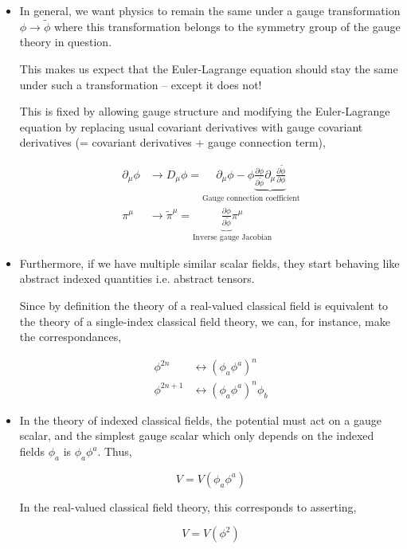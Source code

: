 \documentclass{beamer}
\begin{document}
\begin{frame}
\begin{itemize}
\item In general, we want physics to remain the same under a gauge transformation $\phi \to \widetilde{\phi}$ where this transformation belongs to the symmetry group of the gauge theory in question.

This makes us expect that the Euler-Lagrange equation should stay the same under such a transformation -- except it does not! 

This is fixed by allowing gauge structure and modifying the Euler-Lagrange equation by replacing usual covariant derivatives with gauge covariant derivatives (= covariant derivatives + gauge connection term),

\begin{align*}
\partial_\mu \phi & \to D_\mu \phi = \underset{\text{Gauge connection coefficient}}{\partial_\mu \phi - \phi \underbrace{\frac{\partial \phi}{\partial \widetilde{\phi}} \partial_\mu \frac{\partial \widetilde{\phi}}{\partial \phi}}} \\
\pi^\mu & \to \widetilde{\pi}^\mu = \underset{\text{Inverse gauge Jacobian}}{\underbrace{\frac{\partial \phi}{\partial \widetilde{\phi}}} \pi^\mu}
\end{align*}
\end{itemize}
\end{frame}

\begin{frame}
\begin{itemize}
\item Furthermore, if we have multiple similar scalar fields, they start behaving like abstract indexed quantities i.e. abstract tensors.

Since by definition the theory of a real-valued classical field is equivalent to the theory of a single-index classical field theory, we can, for instance, make the correspondances,

\begin{align*}
\phi^{2n} & \leftrightarrow \left( \phi_a \phi^a \right)^n \\
\phi^{2n+1} & \leftrightarrow \left( \phi_a \phi^a \right)^n \phi_b
\end{align*}

\item In the theory of indexed classical fields, the potential must act on a gauge scalar, and the simplest gauge scalar which only depends on the indexed fields $\phi_a$ is $\phi_a \phi^a$. Thus,

$$V = V \left( \phi_a \phi^a \right)$$

In the real-valued classical field theory, this corresponds to asserting,

$$V = V \left( \phi^2 \right)$$
\end{itemize}
\end{frame}
\end{document}
